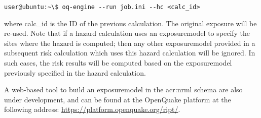 \begin{verbatim}
user@ubuntu:~\$ oq-engine --run job.ini --hc <calc_id>
\end{verbatim}

where calc\_id is the ID of the previous calculation. The original exposure
will be re-used. Note that if a hazard calculation uses an \gls{exposuremodel}
to specify the sites where the hazard is computed; then any other
\gls{exposuremodel} provided in a subsequent risk calculation which uses this
hazard calculation will be  ignored. In such cases, the risk results will be
computed based on the \gls{exposuremodel} previously specified in the hazard
calculation.



A web-based tool to build an \gls{exposuremodel} in the \gls{acr:nrml} schema
are also under development, and can be found at the OpenQuake platform at the
following address: \href{https://platform.openquake.org/ript/}{https://platform.openquake.org/ript/}.
